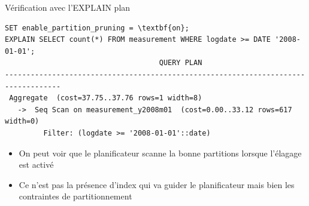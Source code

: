 
\begin{frame}[fragile]{Vérification avec l'EXPLAIN plan}

\begin{tiny}
\begin{Verbatim}[commandchars=\#\{\}]
SET enable_partition_pruning = \textbf{on};
EXPLAIN SELECT count(*) FROM measurement WHERE logdate >= DATE '2008-01-01';
                                    QUERY PLAN
-----------------------------------------------------------------------------------
 Aggregate  (cost=37.75..37.76 rows=1 width=8)
   ->  Seq Scan on measurement_y2008m01  (cost=0.00..33.12 rows=617 width=0)
         Filter: (logdate >= '2008-01-01'::date)
\end{Verbatim}
\end{tiny}

   \begin{itemize}
      \item On peut voir que le planificateur scanne la bonne partitions lorsque l'élagage est activé
      \item Ce n'est pas la présence d'index qui va guider le planificateur mais bien les contraintes de partitionnement
   \end{itemize}

\end{frame}

